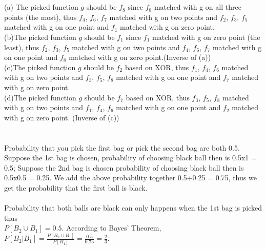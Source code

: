 \documentclass[12pt]{article}
\begin{document}
 \\\\
\indent (a) The picked function $g$ should be $f_8$ since $f_8$ matched with g on all three points (the most), thus $f_4$, $f_6$, $f_7$ matched with g on two points and $f_2$, $f_3$, $f_5$ matched with g on one point and $f_1$ matched with g on zero point.\\
\indent (b)The picked function $g$ should be $f_1$ since $f_1$ matched with g on zero point (the least), thus $f_2$, $f_3$, $f_5$ matched with g on two points and $f_4$, $f_6$, $f_7$ matched with g on one point and $f_8$ matched with g on zero point.(Inverse of (a))\\
\indent (c)The picked function $g$ should be $f_2$ based on XOR, thus $f_1$, $f_4$, $f_6$ matched with g on two points and $f_3$, $f_5$, $f_8$ matched with g on one point and $f_7$ matched with g on zero point.\\
\indent (d)The picked function $g$ should be $f_7$ based on XOR, thus $f_3$, $f_5$, $f_8$ matched with g on two points and $f_1$, $f_4$, $f_6$ matched with g on one point and $f_2$ matched with g on zero point. (Inverse of (c))\\

\newpage
{} \\\\
\indent Probability that you pick the first bag or pick the second bag are both 0.5. Suppose the 1st bag is chosen, probability of choosing black ball then is 0.5x1 = 0.5; Suppose the 2nd bag is chosen probability of choosing black ball then is 0.5x0.5 = 0.25. We add the above probability together 0.5+0.25 = 0.75, thus we get the probability that the first ball is black.\\\\
\indent Probability that both balls are black can only happens when the 1st bag is picked thus \\$P[B_2\cup B_1] = 0.5$. According to Bayes' Theorem, $P[B_2|B_1] = \frac{P[B_2\cup B_1]}{P[B_1]} = \frac{0.5}{0.75} = \frac{2}{3}$.\\
\end{document}
